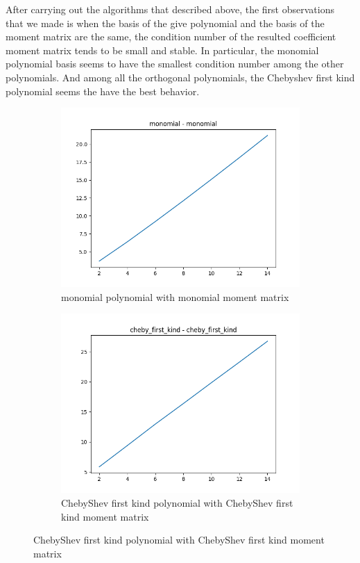 \documentclass[12pt]{amsart}
\numberwithin{equation}{section}
\theoremstyle{definition}
\numberwithin{thm}{section}
\begin{document}
After carrying out the algorithms that described above, the first observations that we made is 
when the basis of the give polynomial and the basis of the moment matrix are the same, 
the condition number of the resulted coefficient moment matrix tends to be small and stable. 
In particular, the monomial polynomial basis seems to have the smallest condition number among the other polynomials.
And among all the orthogonal polynomials, the Chebyshev first kind polynomial seems the have the best behavior.
\begin{figure}[h]
     \centering
     \begin{subfigure}[b]{0.475\textwidth}
         \centering
         \includegraphics[width=\textwidth]{imgs/monomial_monomial.png}
         \caption[Monomial polynomial with monomial moment matrix]%
         {\small monomial polynomial with monomial moment matrix}%

     \end{subfigure}
     \hfill
     \begin{subfigure}[b]{0.475\textwidth}  
         \centering 
         \includegraphics[width=\textwidth]{imgs/cheby_first_kind_cheby_first_kind.png}
         \caption[ChebyShev first kind polynomial with ChebyShev first kind moment matrix]%
         {\small ChebyShev first kind polynomial with ChebyShev first kind moment matrix}%
 

\end{subfigure}
\end{figure}
\end{document}
